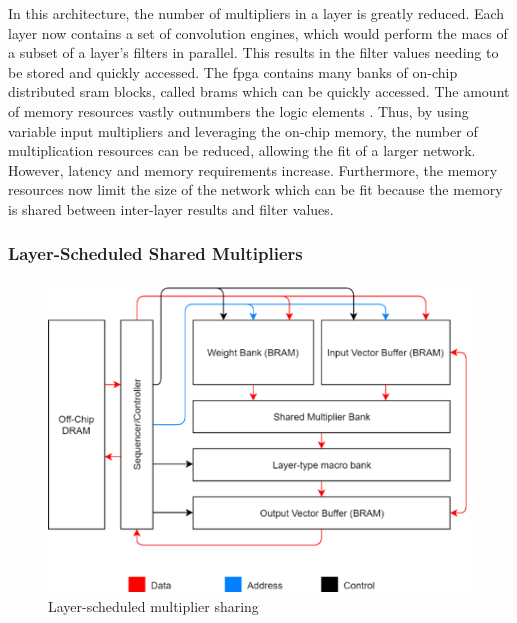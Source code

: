 \documentclass{uw-ece-wkrpt}
\begin{document}
In this architecture, the number of multipliers in a layer is greatly reduced. Each layer now contains a set of convolution engines, which would perform the \glspl{mac} of a subset of a layer's \glspl{filter} in parallel. This results in the \gls{filter} values needing to be stored and quickly accessed. The \gls{fpga} contains many banks of on-chip distributed \gls{sram} blocks, called \glspl{bram} which can be quickly accessed. The amount of memory resources vastly outnumbers the logic elements \cite{Intel-Corp.2018IntelR-ArriaR-1}. Thus, by using variable input multipliers and leveraging the on-chip memory, the number of multiplication resources can be reduced, allowing the fit of a larger network. However, latency and memory requirements increase. Furthermore, the memory resources now limit the size of the network which can be fit because the memory is shared between inter-layer results and \gls{filter} values.

\subsubsection{Layer-Scheduled Shared Multipliers}

\begin{figure}
    \centering
    \includegraphics[width=\textwidth]{figures/layer-scheduled_multiplier}
    \caption{Layer-scheduled multiplier sharing \cite{Ma2017An-automatic-RT}}\label{fig:layer_scheduled_multiplier}
\end{figure}
\end{document}
